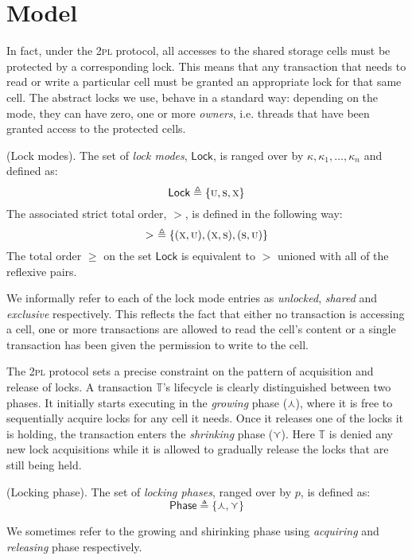 \section{Model}

\label{sec:2plMod}

In fact, under the \textsc{2pl} protocol, all accesses to the shared storage cells must be protected by a corresponding lock. This means that any transaction that needs to read or write a particular cell must be granted an appropriate lock for that same cell. The abstract locks we use, behave in a standard way: depending on the mode, they can have zero, one or more \textit{owners}, i.e. threads that have been granted access to the protected cells.

\begin{defn}
	(Lock modes).
	The set of \emph{lock modes}, $\mathsf{Lock}$, is ranged over by $\kappa, \kappa_1, \ldots, \kappa_n$ and defined as:
	\[
		\mathsf{Lock} \triangleq \{ \textsc{u}, \textsc{s}, \textsc{x} \}
	\]
	The associated strict total order, $>$, is defined in the following way:
	\[
		>\ \triangleq \{ (\textsc{x}, \textsc{u}), (\textsc{x}, \textsc{s}), (\textsc{s}, \textsc{u}) \}
	\]
	The total order $\geq$ on the set $\mathsf{Lock}$ is equivalent to $>$ unioned with all of the reflexive pairs.
\end{defn}
We informally refer to each of the lock mode entries as \textit{unlocked}, \textit{shared} and \textit{exclusive} respectively. This reflects the fact that either no transaction is accessing a cell, one or more transactions are allowed to read the cell's content or a single transaction has been given the permission to write to the cell.

The \textsc{2pl} protocol sets a precise constraint on the pattern of acquisition and release of locks. A transaction $\mathds{T}$'s lifecycle is clearly distinguished between two phases. It initially starts executing in the \textit{growing} phase ($\curlywedge$), where it is free to sequentially acquire locks  for any cell it needs. Once it releases one of the locks it is holding, the transaction enters the \textit{shrinking} phase ($\curlyvee$). Here $\mathds{T}$ is denied any new lock acquisitions while it is allowed to gradually release the locks that are still being held.
\begin{defn}
	(Locking phase).
	 The set of \emph{locking phases}, ranged over by $p$, is defined as:
	 \[
	 	\mathsf{Phase} \triangleq \{ \curlywedge, \curlyvee \}
	 \]
\end{defn}
We sometimes refer to the growing and shirinking phase using \textit{acquiring} and \textit{releasing} phase respectively.

